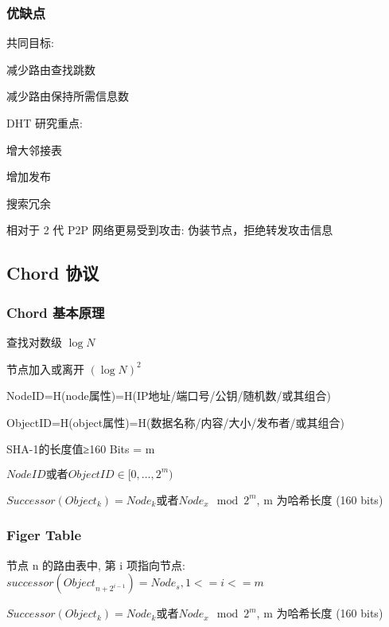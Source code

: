 \documentclass[UTF8,cs4size]{ctexart}
\begin{document}
\subsubsection{优缺点}
共同目标:
\begin{compactitem}
  \item 减少路由查找跳数
  \item 减少路由保持所需信息数
\end{compactitem}

DHT 研究重点:
\begin{compactitem}
  \item 增大邻接表
  \item 增加发布
  \item 搜索冗余
  \item 相对于 2 代 P2P 网络更易受到攻击: 伪装节点，拒绝转发攻击信息
\end{compactitem}
\subsection{Chord 协议}
\subsubsection{Chord 基本原理}
\begin{compactitem}
  \item 查找对数级 $\log N$
  \item 节点加入或离开 $(\log N)^2$
  \item NodeID=H(node属性)=H(IP地址/端口号/公钥/随机数/或其组合)
  \item ObjectID=H(object属性)=H(数据名称/内容/大小/发布者/或其组合)
  \item SHA-1的长度值≥160 Bits = m
  \item $NodeID \text{或者} ObjectID \in [0, \dots, 2^m)$
  \item $Successor(Object_k) = Node_k \text{或者} Node_x \mod 2^m$, m 为哈希长度 (160 bits)
\end{compactitem}
\subsubsection{Figer Table}
\begin{compactitem}
  \item 节点 n 的路由表中, 第 i 项指向节点: $successor(Object_{n+2^{i-1}}) = Node_s,1 <= i <= m$
  \item $Successor(Object_k) = Node_k \text{或者} Node_x \mod 2^m$, m 为哈希长度 (160 bits)
\end{compactitem}
\end{document}
